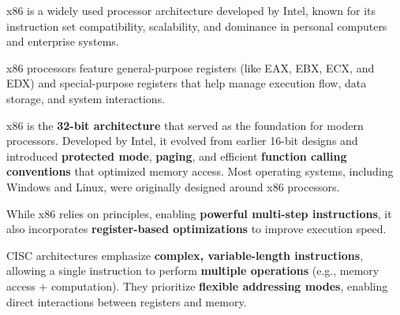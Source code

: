 \begin{NxSSSBox}[breakable][x86]
	\begin{NxIDBox}
		x86 is a widely used processor architecture developed by Intel, known for its instruction set compatibility, scalability, and dominance in personal computers and enterprise systems.
	\end{NxIDBox}
	\begin{NxIDBoxL}
		 x86 processors feature general-purpose registers (like EAX, EBX, ECX, and EDX) and special-purpose registers that help manage execution flow, data storage, and system interactions.
	\end{NxIDBoxL}
\end{NxSSSBox}

\begin{NxSSSSBox}[breakable][Introduction to x86]
	\begin{NxIDBox}
		x86 is the \textbf{32-bit architecture} that served as the foundation for modern processors. Developed by Intel, it evolved from earlier 16-bit designs and introduced \textbf{protected mode}, \textbf{paging}, and efficient \textbf{function calling conventions} that optimized memory access. Most operating systems, including Windows and Linux, were originally designed around x86 processors.
	\end{NxIDBox}
	\begin{NxIDBox}
		While x86 relies on  principles, enabling \textbf{powerful multi-step instructions}, it also incorporates \textbf{register-based optimizations} to improve execution speed.
	\end{NxIDBox}
	\begin{NxIDBox}
		CISC architectures emphasize \textbf{complex, variable-length instructions}, allowing a single instruction to perform \textbf{multiple operations} (e.g., memory access + computation). They prioritize \textbf{flexible addressing modes}, enabling direct interactions between registers and memory.
	\end{NxIDBox}
\end{NxSSSSBox}


